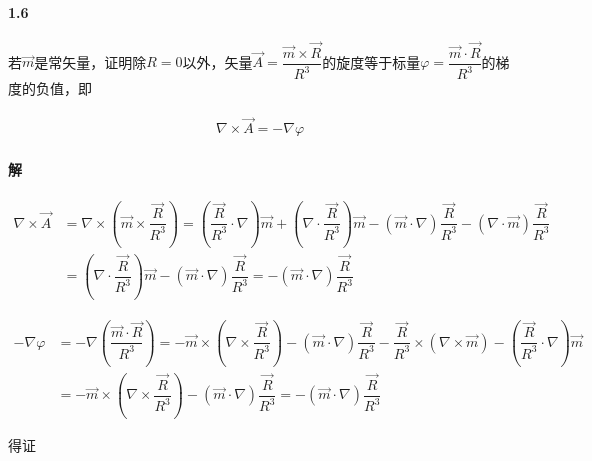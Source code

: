 \documentclass{article}
\begin{document}
\paragraph{1.6}

若$\vec{m}$是常矢量，证明除$R=0$以外，矢量$\vec{A} = \dfrac{\vec{m} \times \vec{R}}{R^3} $的旋度等于标量$\varphi = \dfrac{\vec{m} \cdot \vec{R}}{R^3} $的梯度的负值，即

\begin{equation*}
  \begin{aligned}
    \nabla \times \vec{A} = - \nabla \varphi
  \end{aligned}
\end{equation*}

\paragraph{解}

\begin{equation*}
  \begin{aligned}
    \nabla \times \vec{A} &= \nabla \times \left( \vec{m} \times \dfrac{\vec{R}}{R^3}  \right) = \left( \dfrac{\vec{R}}{R^3} \cdot \nabla  \right) \vec{m} + \left( \nabla \cdot \dfrac{\vec{R}}{R^3}  \right) \vec{m} - \left( \vec{m} \cdot \nabla \right)\dfrac{\vec{R}}{R^3} - \left( \nabla \cdot \vec{m} \right) \dfrac{\vec{R}}{R^3} \\
    &= \left( \nabla \cdot \dfrac{\vec{R}}{R^3}  \right) \vec{m} - \left( \vec{m} \cdot \nabla \right) \dfrac{\vec{R}}{R^3} = - \left( \vec{m} \cdot \nabla \right) \dfrac{\vec{R}}{R^3}  
  \end{aligned}
\end{equation*}

\begin{equation*}
  \begin{aligned}
    - \nabla \varphi &= - \nabla \left( \dfrac{\vec{m} \cdot \vec{R}}{R^3}  \right) = - \vec{m} \times \left( \nabla \times \dfrac{\vec{R}}{R^3}  \right) - \left( \vec{m} \cdot \nabla \right) \dfrac{\vec{R}}{R^3} - \dfrac{\vec{R}}{R^3} \times \left( \nabla \times \vec{m} \right) - \left( \dfrac{\vec{R}}{R^3} \cdot \nabla  \right) \vec{m} \\
    &= - \vec{m} \times \left( \nabla \times \dfrac{\vec{R}}{R^3}  \right) - \left( \vec{m} \cdot \nabla \right) \dfrac{\vec{R}}{R^3} = - \left( \vec{m} \cdot \nabla \right) \dfrac{\vec{R}}{R^3}  
  \end{aligned}
\end{equation*}

得证
\end{document}
